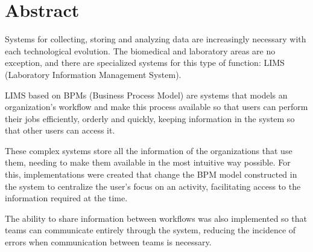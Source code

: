 \section{Abstract}

Systems for collecting, storing and analyzing data are increasingly necessary with each technological evolution. The biomedical and laboratory areas are no exception, and there are specialized systems for this type of function: LIMS (Laboratory Information Management System).

LIMS based on BPMs (Business Process Model) are systems that models an organization's workflow and make this process available so that users can perform their jobs efficiently, orderly and quickly, keeping information in the system so that other users can access it.

These complex systems store all the information of the organizations that use them, needing to make them available in the most intuitive way possible. For this, implementations were created that change the BPM model constructed in the system to centralize the user's focus on an activity, facilitating access to the information required at the time.

The ability to share information between workflows was also implemented so that teams can communicate entirely through the system, reducing the incidence of errors when communication between teams is necessary.